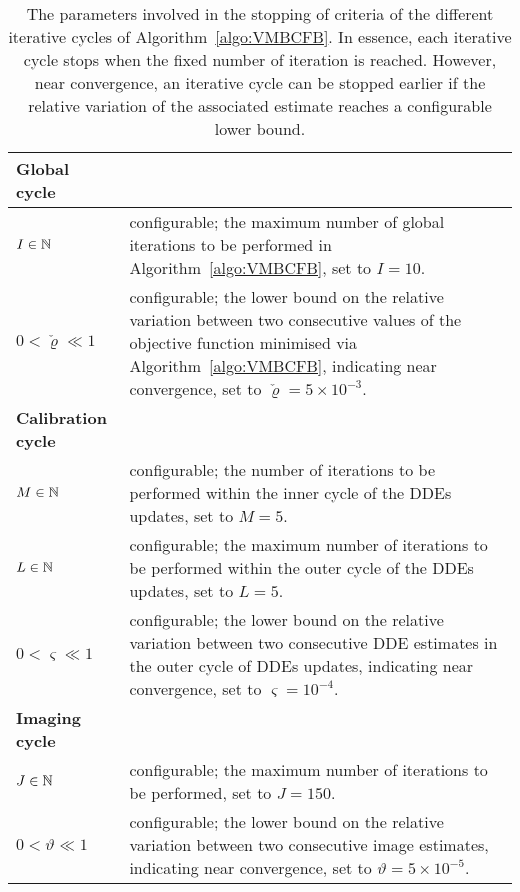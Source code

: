 
\begin{table}
 {{	\caption{The parameters involved in the stopping of criteria of the different iterative cycles of Algorithm~\ref{algo:VMBCFB}. In essence, each iterative cycle stops when the fixed number of iteration is reached. However, near convergence, an iterative cycle can be stopped earlier if the relative variation of the associated estimate reaches a configurable lower bound.}
 	
 	\centering
	\small
 	\begin{tabular}{p{2.1cm}p{5.5cm}}
	\hline
   \textbf{Global cycle}	 & ~\\
    \hline
    ${I} \in \mathbb{N} $ & configurable; the maximum number of global iterations to be performed in Algorithm~\ref{algo:VMBCFB}, set to ${I}=10$.\\
	$0 < \check{\varrho} \ll 1 $ & configurable; the lower bound on the relative variation between two consecutive values of the objective function minimised via Algorithm~\ref{algo:VMBCFB}, indicating near convergence,  set to $\check{\varrho}=5\times10^{-3}$.\\
	\hline
	\textbf{Calibration cycle} & ~\\
	\hline
	${M} \in \mathbb{N} $ & configurable; the number of iterations to be performed within the inner cycle of the DDEs updates, set to $M=5$.\\
	${L} \in \mathbb{N} $ & configurable; the maximum number of iterations to be performed within the outer cycle of the DDEs updates, set to ${L}=5$.\\
	$0 < \varsigma \ll 1 $ & configurable; the lower bound on the relative variation between two consecutive DDE estimates in the outer cycle of DDEs updates, indicating near convergence, set to $\varsigma=10^{-4}$.\\
	\hline
    \textbf{Imaging cycle} & ~ \\
	\hline
	${J} \in \mathbb{N}$ & configurable; the maximum number of iterations to be performed,  set to ${J}=150$.\\
	$0 < \vartheta \ll 1 $ & configurable; the lower bound on the relative variation between two consecutive image estimates, indicating near convergence, set to $\vartheta=5\times10^{-5}$.\\
	\hline 
 	\end{tabular}
\label{tab:auxvars}
}}
\end{table}

